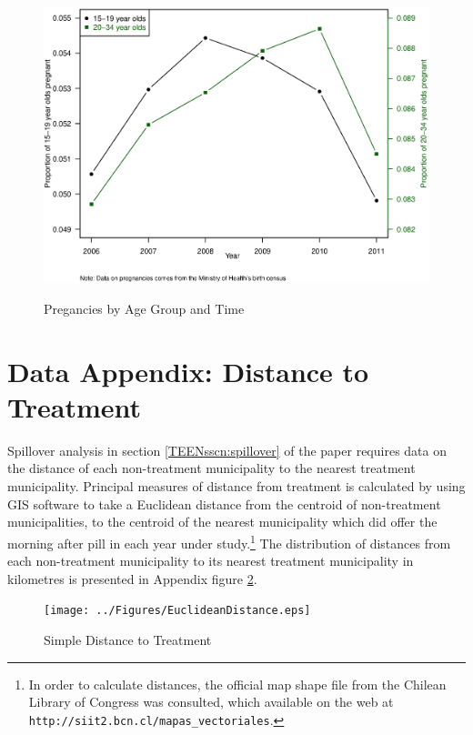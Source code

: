 \documentclass[11pt,subeqn]{article}
\renewcommand\thesection{\Alph{section}}
\begin{document}
\begin{spacing}{1.4}
\begin{figure}[htpb!]
\begin{center}
\caption{Pregancies by Age Group and Time}
\vspace{-5mm}
\label{TEENfig:Pregtime}
\includegraphics[scale=0.54]{../Figures/Births.eps} 
\end{center}
\end{figure}


\clearpage
\renewcommand\thesection{\Alph{section}}
\setlength\parindent{0.25in}
\setlength\parskip{0.25in}

\section{Data Appendix: Distance to Treatment}
Spillover analysis in section \ref{TEENsscn:spillover} of the paper requires
data on the distance of each non-treatment municipality to the nearest 
treatment municipality.  Principal measures of distance from treatment is 
calculated by using GIS software to take a Euclidean distance from the 
centroid of non-treatment municipalities, to the centroid of the nearest 
municipality which did offer the morning after pill in each year under 
study.\footnote{In order to calculate distances, the official map shape file
from the Chilean Library of Congress was consulted, which available on the
web at \texttt{http://siit2.bcn.cl/mapas_vectoriales}.}  The distribution of
distances from each non-treatment municipality to its nearest treatment 
municipality in kilometres is presented in Appendix figure \ref{dist}.

\begin{figure}[htpb!]
\texttt{[image: ../Figures/EuclideanDistance.eps]}
\caption{Simple Distance to Treatment}
\label{dist}
\end{figure}



\end{spacing}
\end{document}
